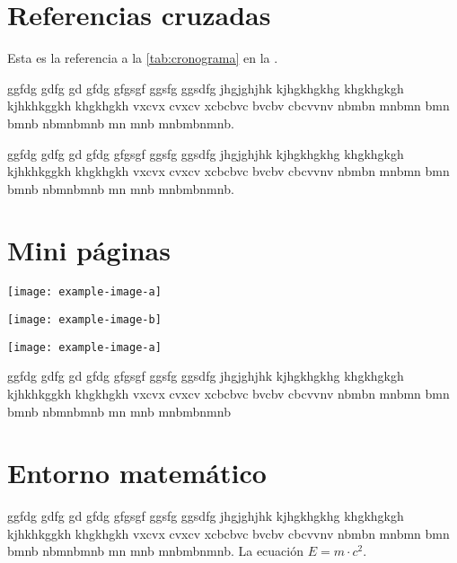 \newpage
\section{Referencias cruzadas}
Esta es la referencia a la \autoref{tab:cronograma} en la .

ggfdg gdfg gd gfdg gfgsgf ggsfg ggsdfg jhgjghjhk kjhgkhgkhg khgkhgkgh kjhkhkggkh khgkhgkh vxcvx cvxcv xcbcbvc bvcbv cbcvvnv nbmbn mnbmn bmn bmnb nbmnbmnb mn mnb mnbmbnmnb.

ggfdg gdfg gd gfdg gfgsgf ggsfg ggsdfg jhgjghjhk kjhgkhgkhg khgkhgkgh kjhkhkggkh khgkhgkh vxcvx cvxcv xcbcbvc bvcbv cbcvvnv nbmbn mnbmn bmn bmnb nbmnbmnb mn mnb mnbmbnmnb.

\section{Mini páginas}
\begin{center}
	\begin{minipage}{0.47\linewidth} %
		\texttt{[image: example-image-a]}
	\end{minipage}
	\begin{minipage}{0.47\linewidth}
		\texttt{[image: example-image-b]}
	\end{minipage}
\end{center}

\begin{center}
	\begin{minipage}{0.47\linewidth} %
		\texttt{[image: example-image-a]}
	\end{minipage}\hfil
	\begin{minipage}{0.3\linewidth}
		ggfdg gdfg gd gfdg gfgsgf ggsfg ggsdfg jhgjghjhk kjhgkhgkhg khgkhgkgh kjhkhkggkh khgkhgkh vxcvx cvxcv xcbcbvc bvcbv cbcvvnv nbmbn mnbmn bmn bmnb nbmnbmnb mn mnb mnbmbnmnb
	\end{minipage}
\end{center}

\section{Entorno matemático}
ggfdg gdfg gd gfdg gfgsgf ggsfg ggsdfg jhgjghjhk kjhgkhgkhg khgkhgkgh kjhkhkggkh khgkhgkh vxcvx cvxcv xcbcbvc bvcbv cbcvvnv nbmbn mnbmn bmn bmnb nbmnbmnb mn mnb mnbmbnmnb. La ecuación $ E = m \cdot c^2 $.

